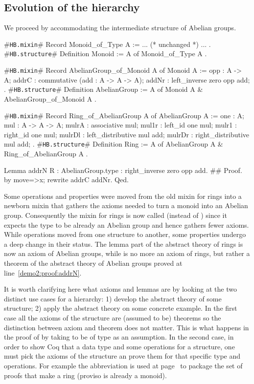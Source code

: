 \documentclass[a4paper,UKenglish,cleveref, autoref]{lipics-v2019}
\newcommand{\mixin}{mixin}
\newcommand{\phantterm}{abbreviation}
\newcommand{\hbmixin}{{\tt\color{dkgreen}HB.mixin}}
\newcommand{\hbstructure}{{\tt\color{dkgreen}HB.structure}}
\theoremstyle{implem}
\theoremstyle{implem}
\theoremstyle{command}
\begin{document}
\subsection{Evolution of the hierarchy}\label{subsec:evolution}

We proceed by accommodating the intermediate
structure of Abelian groups.

\begin{coqcode}
#\hbmixin{}# Record Monoid_of_Type A := { ... (* unchanged *) ... }.
#\hbstructure{}# Definition Monoid := { A of Monoid_of_Type A }.

#\hbmixin{}# Record AbelianGroup_of_Monoid A of Monoid A := {
  opp : A -> A;
  addrC : commutative (add : A -> A -> A);
  addNr : left_inverse zero opp add;
}.
#\hbstructure{}# Definition AbelianGroup := { A of Monoid A & AbelianGroup_of_Monoid A }.

#\hbmixin{}# Record Ring_of_AbelianGroup A of AbelianGroup A := {
  one : A;
  mul : A -> A -> A;
  mulrA : associative mul;
  mul1r : left_id one mul;              mulr1 : right_id one mul;
  mulrDl : left_distributive mul add;   mulrDr : right_distributive mul add;
}.
#\hbstructure{}# Definition Ring := { A of AbelianGroup A & Ring_of_AbelianGroup A }.

Lemma addrN {R : AbelianGroup.type} : right_inverse zero opp add.               #\label{demo2:proof:addrN}#
Proof. by move=>x; rewrite addrC addNr. Qed.
\end{coqcode}

Some operations and properties were moved from the old \mixin{} for rings
into a newborn \mixin{}  that gathers the
axioms needed to turn a monoid into an Abelian group. Consequently the \mixin{}
for rings is now called  (instead of )
since it expects the type  to be already an Abelian group and hence
gathers fewer axioms.
While operations moved from one structure to another, some properties
undergo a deep change in their status.
The lemma  part of the abstract theory of
rings is now an axiom of Abelian groups, while  is no more
an axiom of rings, but rather a theorem of the abstract theory of Abelian
groups proved at line~\ref{demo2:proof:addrN}.

It is worth clarifying here what axioms and lemmas are by looking at the
two distinct use cases for a hierarchy: 1) develop the abstract theory of some
structure; 2) apply the abstract theory on some concrete example.
In the first case
all the axioms of the structure are (assumed to be) theorems so the distinction
between axiom and theorem does not matter. This is what happens
in the proof of  by taking  to be of type
 as an assumption.
In the second case,
in order to show Coq that a data type and some operations for a structure,
one must pick the axioms of the structure an prove them for that specific
type and operations. For example the  \phantterm{}
is used at page~\pageref{demo:theory:z:ring:axioms} to package the set
of proofs that make  a ring (proviso  is already a monoid).
\end{document}
